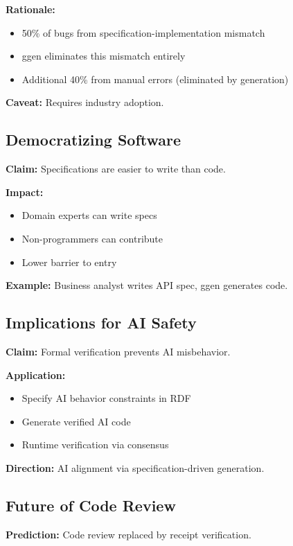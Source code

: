 \textbf{Rationale:}
\begin{itemize}
    \item 50\% of bugs from specification-implementation mismatch
    \item ggen eliminates this mismatch entirely
    \item Additional 40\% from manual errors (eliminated by generation)
\end{itemize}

\textbf{Caveat:} Requires industry adoption.

\subsection{Democratizing Software}

\textbf{Claim:} Specifications are easier to write than code.

\textbf{Impact:}
\begin{itemize}
    \item Domain experts can write specs
    \item Non-programmers can contribute
    \item Lower barrier to entry
\end{itemize}

\textbf{Example:} Business analyst writes API spec, ggen generates code.

\subsection{Implications for AI Safety}

\textbf{Claim:} Formal verification prevents AI misbehavior.

\textbf{Application:}
\begin{itemize}
    \item Specify AI behavior constraints in RDF
    \item Generate verified AI code
    \item Runtime verification via consensus
\end{itemize}

\textbf{Direction:} AI alignment via specification-driven generation.

\subsection{Future of Code Review}

\textbf{Prediction:} Code review replaced by receipt verification.

